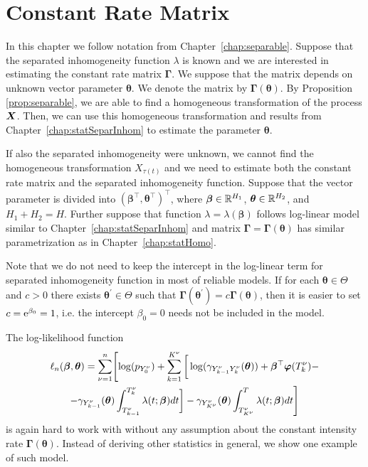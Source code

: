 {\section{Constant Rate Matrix}

In this chapter we follow notation from Chapter~\ref{chap:separable}. Suppose that the separated inhomogeneity function $\lambda$ is known and we are interested in estimating the constant rate matrix $\bm{\Gamma}$. We suppose that the matrix depends on unknown vector parameter $\bm{\theta}$. We denote the matrix by $\bm{\Gamma} (\bm{\theta})$. By Proposition \ref{prop:separable}, we are able to find a homogeneous transformation of the process $\bm{X}$. Then, we can use this homogeneous transformation and results from Chapter~\ref{chap:statSeparInhom} to estimate the parameter $\bm{\theta}$.

If also the separated inhomogeneity were unknown, we cannot find the homogeneous transformation $X_{\tau(t)}$ and we need to estimate both the constant rate matrix and the separated inhomogeneity function. Suppose that the vector parameter is divided into $(\bm{\beta}^{\top}, \bm{\theta}^{\top})^{\top}$, where $\bm{\beta} \in \mathbb{R}^{H_1}$, $\bm{\theta} \in \mathbb{R}^{H_2}$, and $H_1 + H_2 = H$. Further suppose that function $\lambda = \lambda (\bm{\beta})$ follows log-linear model similar to Chapter~\ref{chap:statSeparInhom} and matrix $\bm{\Gamma} = \bm{\Gamma} (\bm{\theta})$ has similar parametrization as in Chapter~\ref{chap:statHomo}.

Note that we do not need to keep the intercept in the log-linear term for separated inhomogeneity function in most of reliable models. If for each $\bm{\theta} \in \Theta$ and $c > 0$ there exists $\bm{\theta}^{'} \in \Theta$ such that $\bm{\Gamma} (\bm{\theta}^{'}) = c \bm{\Gamma} ( \bm{\theta} )$, then it is easier to set $c = \operatorname{\mathrm{e}}^{\beta_0} = 1$, i.e. the intercept $\beta_0 = 0$ needs not be included in the model.

The log-likelihood function
\begin{multline*}
	\ell_n (\bm{\beta}, \bm{\theta})
	= \sum_{\nu=1}^n \Biggl[ \log( p_{Y_0^{\nu}}) +
	\sum_{k=1}^{K^{\nu}} \bigg[ \log(\gamma_{Y_{k-1}^{\nu} Y_{k}^{\nu}} (\bm{\theta})) + \bm{\beta}^\top \bm{\varphi} (T_k^{\nu}) - \\
	- \gamma_{Y_{k-1}^{\nu}} (\bm{\theta}) \int_{T_{k-1}^{\nu}}^{T_k^{\nu}} \lambda(t; \bm{\beta}) dt \bigg] -
	\gamma_{Y_{K^{\nu}}^{\nu}} (\bm{\theta}) \int_{T_{K^{\nu}}^{\nu}}^{T} \lambda(t; \bm{\beta}) dt \Biggr]
\end{multline*}
is again hard to work with without any assumption about the constant intensity rate $\bm{\Gamma} (\bm{\theta})$. Instead of deriving other statistics in general, we show one example of such model.

}
